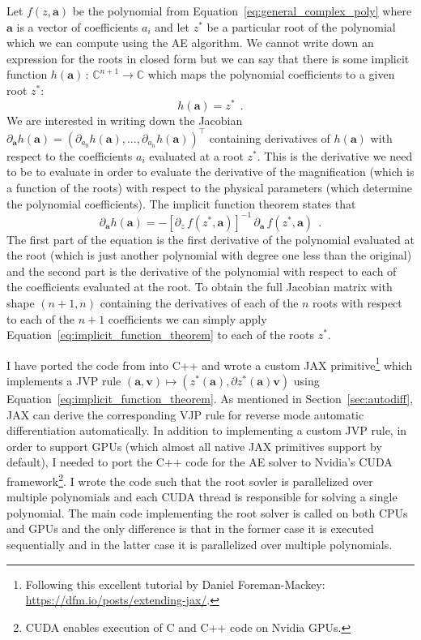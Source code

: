 \documentclass[12pt,dvipsnames]{report}
\newcommand{\ssf}[1]{\textsf{#1}}
\renewcommand{\vec}[1]{\boldsymbol{\mathbf{#1}}}
\newcommand{\hquad}{~~}
\begin{document}
Let $f(z, \vec{a})$ be the polynomial from Equation~\ref{eq:general_complex_poly} where 
$\vec{a}$ is a vector of coefficients $a_i$ and let $z^*$ be a particular root of the 
polynomial which we can compute using the AE algorithm. We cannot write down an
expression for the roots in closed form but we can say that there is some
implicit function $h(\vec a)\,:\,\mathbb{C}^{n+1}\rightarrow\mathbb{C}$ which maps the 
polynomial coefficients to a given root $z^*$:
\begin{equation}
    h(\vec{a})=z^*\hquad .
\end{equation}
 We are interested in writing down the
Jacobian $\partial_{\vec a} h(\vec{a})=(\partial_{a_0} h(\vec a),\ldots,\partial_{a_n} h(\vec{a}))^\intercal$ 
containing derivatives of $h(\vec{a})$ with respect to the
coefficients $a_i$  evaluated at a root $z^*$. This is the derivative we need to be
to evaluate in order to evaluate the derivative of the magnification
(which is a function of the roots) with respect to the physical parameters
(which determine the polynomial coefficients). The implicit function theorem
states that
\begin{equation}
    \partial_{\vec a}h(\vec{a})=-\left[\partial_z\,f(z^*,\vec{a})\right]^{-1}\,\partial_{\vec a}\,f (z^*,\vec a) \hquad .
    \label{eq:implicit_function_theorem}
\end{equation}
The first part of the equation is the first derivative of the polynomial evaluated at the
root (which is just another polynomial with degree one less than the original) and the second part 
is the derivative of the polynomial with respect to each of the
coefficients evaluated at the root. To obtain the full Jacobian matrix  with shape 
$(n+1, n)$ containing the  derivatives of each of the $n$ roots with respect to each of 
the $n+1$ coefficients  we can simply apply Equation~\ref{eq:implicit_function_theorem} 
to each of the roots $z^*$. 

I have ported the code from \citet{cameron2021} into \ssf{C++} and wrote a custom \ssf{JAX}
primitive\footnote{Following this excellent tutorial by Daniel Foreman-Mackey: 
\url{https://dfm.io/posts/extending-jax/}.} which implements a JVP rule 
$\left(\vec{a}, \vec v\right) \mapsto\left(z^{*}\left(\vec a\right), \partial z^{*}\left(\vec a\right) \vec v\right)$
using Equation~\ref{eq:implicit_function_theorem}. As mentioned
in Section~\ref{sec:autodiff}, \ssf{JAX} can derive the corresponding VJP rule for 
reverse mode automatic differentiation automatically. In addition to implementing a 
custom JVP rule, in order to support GPUs (which almost all native \ssf{JAX} primitives 
support by default), I needed to port the \ssf{C++} code  for the AE solver to Nvidia's 
\ssf{CUDA} framework\footnote{\ssf{CUDA} enables execution 
of \ssf{C} and \ssf{C++} code on Nvidia GPUs.}. I wrote the code such that the root 
sovler is parallelized over multiple polynomials and each \ssf{CUDA} thread is 
responsible for solving a single polynomial. The main code implementing the root solver is
called on both CPUs and GPUs and the only difference is that in the former case it is 
executed sequentially and in the latter case it is parallelized over multiple polynomials. 
\end{document}

